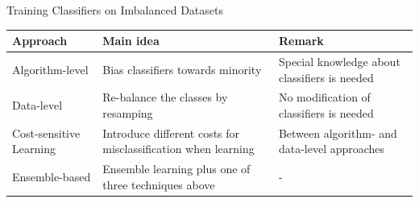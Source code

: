\documentclass[11pt,compress,t,notes=noshow, xcolor=table]{beamer}
\begin{document}
\begin{vbframe}{Training Classifiers on Imbalanced Datasets}
\small
\begin{table}[h]
    \centering
    \begin{tabular}{p{} p{} p{}}
        \toprule
        \textbf{Approach} & \textbf{Main idea} & \textbf{Remark} \\ [5pt]
        \hline
        Algorithm-level & Bias classifiers towards minority & Special knowledge about classifiers is needed \\ [5pt]
        \hline
        Data-level & Re-balance the classes by resamping & No modification of classifiers is needed \\ [5pt]
        \hline
        Cost-sensitive Learning & Introduce different costs for misclassification when learning & Between algorithm- and data-level approaches \\ [15pt]
        \hline
        Ensemble-based & Ensemble learning plus one of three techniques above & - \\ [5pt]
        \bottomrule
    \end{tabular}
\end{table}

\end{vbframe}



\endlecture
\end{document}
